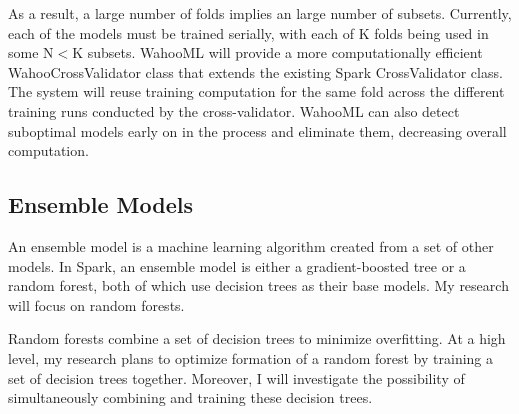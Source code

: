 \documentclass[../proposal.tex]{subfiles}
\begin{document}
As a result, a large number of folds implies an large number of subsets.
Currently, each of the models must be trained serially, with each of K folds
being used in some N$<$K subsets. WahooML will provide a more computationally
efficient WahooCrossValidator class that extends the existing Spark
CrossValidator class. The system will reuse training computation for the same
fold across the different training runs conducted by the cross-validator.
WahooML can also detect suboptimal models early on in the process and eliminate
them, decreasing overall computation.

\subsection{Ensemble Models}

An ensemble model is a machine learning algorithm created from a set of other
models. In Spark, an ensemble model is either a gradient-boosted tree or a
random forest, both of which use decision trees as their base models. My
research will focus on random forests.

Random forests combine a set of decision trees to minimize overfitting. At a
high level, my research plans to optimize formation of a random forest by
training a set of decision trees together. Moreover, I will investigate the
possibility of simultaneously combining and training these decision trees.
\end{document}
